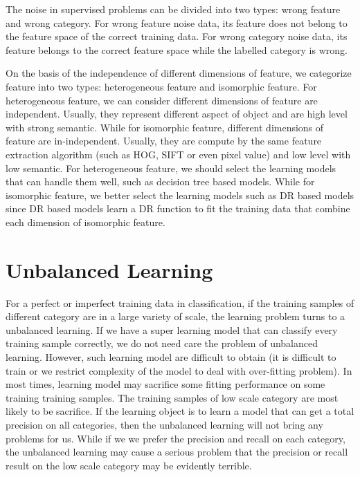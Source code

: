 \documentclass[runningheads,openany]{xhlPaper}
\begin{document}
The noise in supervised problems can be divided into two types: wrong feature and wrong category.
For wrong feature noise data, its feature does not belong to the feature space of the correct training data.
For wrong category noise data, its feature belongs to the correct feature space while the labelled category is wrong.

On the basis of the independence of different dimensions of feature, we categorize feature into two types: heterogeneous feature and isomorphic feature.
For heterogeneous feature, we can consider different dimensions of feature are independent. Usually, they represent different aspect of object and are high level with strong semantic.
While for isomorphic feature, different dimensions of feature are in-independent. Usually, they are compute by the same feature extraction algorithm (such as HOG, SIFT or even pixel value) and low level with low semantic.
For heterogeneous feature, we should select the learning models that can handle them well, such as decision tree based models. While for isomorphic feature, we better select the learning models such as DR based models since DR based models learn a DR function to fit the training data that combine each dimension of isomorphic feature.

\section{Unbalanced Learning}
\label{sec:unbalanced_learning}
For a perfect or imperfect training data in classification, if the training samples of different category are in a large variety of scale, the learning problem turns to a unbalanced learning.
If we have a super learning model that can classify every training sample correctly, we do not need care the problem of unbalanced learning.
However, such learning model are difficult to obtain (it is difficult to train or we restrict complexity of the model to deal with over-fitting problem). In most times, learning model may sacrifice some fitting performance on some training training samples. The training samples of low scale category are most likely to be sacrifice.
If the learning object is to learn a model that can get a total precision on all categories, then the unbalanced learning will not bring any problems for us.
While if we we prefer the precision and recall on each category, the unbalanced learning may cause a serious problem that the precision or recall result on the low scale category may be evidently terrible.
\end{document}
